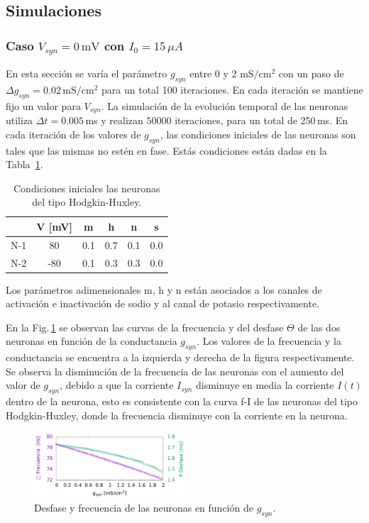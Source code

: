 \subsection{Simulaciones}

   \subsubsection{Caso \texorpdfstring{$V_{syn}= 0\,\text{mV}$}{}   con  \texorpdfstring{$I_0 = 15\,\mu A$}{}}

En esta sección se varía el parámetro $g_{syn}$ entre $0$ y 2 ${\text{mS}}/{\text{cm}^2}$ con un paso de $\Delta g_{syn}=0.02\,{\text{mS}}/{\text{cm}^2}$ para un total 100 iteraciones. En cada iteración se mantiene fijo un valor para $V_{syn}$. La simulación de la evolución temporal de las neuronas utiliza $\Delta t =  0.005\,$ms y realizan $50000$ iteraciones, para un total de 250\,ms. En cada iteración de los valores de $g_{syn}$, las condiciones iniciales de las neuronas son tales que las mismas no estén en fase. Estás condiciones están dadas en la Tabla~\ref{tab:ini}.
\begin{table}[H]
    \centering
    \begin{tabular}{c| c| c |c |c|c}
     & V [mV] & m    & h     & n     & s     \\ \hline
    N-1       & 80      & 0.1  & 0.7   & 0.1   & 0.0   \\ \hline
    N-2       & -80     & 0.1  & 0.3   & 0.3   & 0.0  \\
   \end{tabular}
    \caption{Condiciones iniciales las neuronas del tipo Hodgkin-Huxley.}  
    \label{tab:ini} 
    \end{table}
Los parámetros adimensionales m, h y n están asociados a los canales de activación e  inactivación de sodio y al canal de potasio respectivamente.

En la Fig.\,\ref{fig:des_fre} se observan las curvas de la frecuencia y del desfase $\Theta$ de las dos neuronas en función de la conductancia $g_{syn}$. Los valores de la frecuencia y la conductancia se encuentra a la izquierda y derecha de la figura respectivamente. Se observa la disminución de la frecuencia de las neuronas con el aumento del valor de $g_{syn}$, debido a que la corriente $I_{syn}$ disminuye en media la corriente  $I(t)$ dentro de la neurona, esto es consistente con la curva f-I de las neuronas del tipo Hodgkin-Huxley, donde la frecuencia disminuye con la corriente en la neurona. 
        \begin{figure}[H]
            \centering
            \includegraphics[width=0.5\textwidth]{current_15.png}
            \caption{Desfase y frecuencia de las neuronas en función de $g_{syn}$.}
            \label{fig:des_fre}
        \end{figure}  

